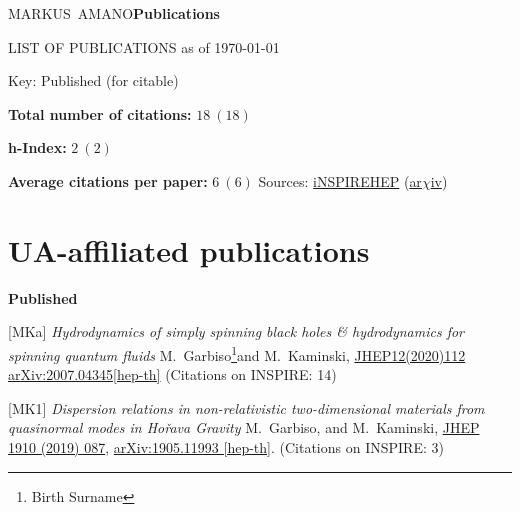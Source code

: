 \documentclass[12pt,letter]{article}
\begin{document}
\begin{cv}{\large MARKUS~AMANO\hfill {\bf \small Publications}}

\noindent\hrulefill

\begin{center}
\huge LIST OF PUBLICATIONS as of \today
\end{center}

\begin{cvlist}{}
\item[Key: Published (for citable)]
\item[\bf Total number of citations:] $18~(18)$
\item[\bf h-Index:] $2~(2)$
\item[\bf Average citations per paper:] $6~(6)$    \hfill Sources: \href{https://inspirehep.net/literature?sort=mostrecent&size=25&page=1&q=a\%20M.Garbiso.1&ui-citation-summary=true}{iNSPIREHEP} 
(\href{https://arxiv.org/search/?searchtype=author&query=Garbiso\%2C+M}{ar$\chi$iv})

\hrulefill
%
\section*{UA-affiliated publications}

%

\hrulefill

\item[ \bf Published] {}
%
\item[{[MKa]}]  
\textit{Hydrodynamics of simply spinning black holes \& hydrodynamics for spinning quantum fluids} 
\newline M.~Garbiso\footnote{Birth Surname}and M.~Kaminski,
\newline  \href{https://doi.org/10.1007/JHEP12(2020)112}{JHEP12(2020)112}
\newline  \href{https://arxiv.org/abs/2007.04345}{arXiv:2007.04345[hep-th]}
(Citations on INSPIRE: 14)
%
\item[{[MK1]}]  
\textit{Dispersion relations in non-relativistic two-dimensional materials from quasinormal modes in Ho\v{r}ava Gravity} 
\newline M.~Garbiso\footnotemark[1], and M.~Kaminski,
\newline \href{https://doi.org/10.1007/JHEP10(2019)087}{JHEP 1910 (2019) 087},
\newline  \href{http://arxiv.org/abs/arXiv:1905.11993}{arXiv:1905.11993 [hep-th]}. 
(Citations on INSPIRE: 3)
%

\end{cvlist}
\end{cv}
\end{document}
